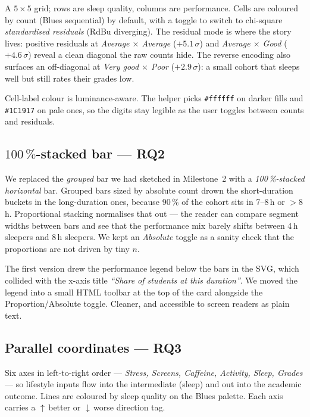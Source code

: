 \documentclass[11pt,a4paper]{article}
\newcommand{\code}[1]{\texttt{\small #1}}
\begin{document}
A $5\times5$ grid; rows are sleep quality, columns are performance. Cells are coloured by count (Blues sequential) by default, with a toggle to switch to chi-square \emph{standardised residuals} (RdBu diverging). The residual mode is where the story lives: positive residuals at \emph{Average $\times$ Average} ($+5.1\,\sigma$) and \emph{Average $\times$ Good} ($+4.6\,\sigma$) reveal a clean diagonal the raw counts hide. The reverse encoding also surfaces an off-diagonal at \emph{Very good $\times$ Poor} ($+2.9\,\sigma$): a small cohort that sleeps well but still rates their grades low.

Cell-label colour is luminance-aware. The helper picks \code{\#ffffff} on darker fills and \code{\#1C1917} on pale ones, so the digits stay legible as the user toggles between counts and residuals.

\subsection{$100\,\%$-stacked bar — RQ2}

We replaced the \emph{grouped} bar we had sketched in Milestone~2 with a \emph{100\,\%-stacked horizontal} bar. Grouped bars sized by absolute count drown the short-duration buckets in the long-duration ones, because 90\,\% of the cohort sits in 7--8\,h or $>$8\,h. Proportional stacking normalises that out — the reader can compare segment widths between bars and see that the performance mix barely shifts between 4\,h sleepers and 8\,h sleepers. We kept an \emph{Absolute} toggle as a sanity check that the proportions are not driven by tiny $n$.

The first version drew the performance legend below the bars in the SVG, which collided with the x-axis title \emph{``Share of students at this duration''}. We moved the legend into a small HTML toolbar at the top of the card alongside the Proportion/Absolute toggle. Cleaner, and accessible to screen readers as plain text.

\subsection{Parallel coordinates — RQ3}

Six axes in left-to-right order — \emph{Stress, Screens, Caffeine, Activity, Sleep, Grades} — so lifestyle inputs flow into the intermediate (sleep) and out into the academic outcome. Lines are coloured by sleep quality on the Blues palette. Each axis carries a \textcolor{good}{$\uparrow$\,better} or \textcolor{alert}{$\downarrow$\,worse} direction tag.
\end{document}
